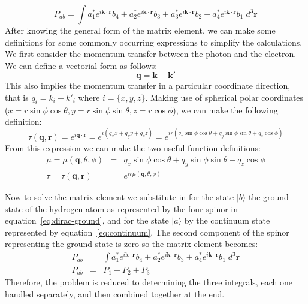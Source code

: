 \documentclass[a4paper,titlepage]{report}
\newcommand{\mb}[1]{\mathbf{#1}}
\newcommand{\ket}[1]{|#1 \rangle}
\begin{document}
	\begin{equation}
		P_{ab} = 
		\int
			a_1^* e^{i \mb{k} \cdot \mb{r}} b_4 + 
			a_2^* e^{i \mb{k} \cdot \mb{r}} b_3 + 
			a_3^* e^{i \mb{k} \cdot \mb{r}} b_2 + 
			a_4^* e^{i \mb{k} \cdot \mb{r}} b_1 
		\; d^3 \mb{r}
	\end{equation}
	After knowing the general form of the matrix element, we can make some
	definitions for some commonly occurring expressions to simplify the
	calculations.
	We first consider the momentum transfer between the photon and the electron.
	We can define a vectorial form as follows:
	\begin{equation}
		\mb{q} = \mb{k} - \mb{k'}
	\end{equation}
	This also implies the momentum transfer in a particular coordinate
	direction, that is $q_i = k_i - k'_i$ where $i = \{x,y,z\}$.
	Making use of spherical polar coordinates ($x = r \sin\phi \cos\theta,
	y = r \sin\phi \sin\theta, z = r \cos\phi$), we can make the following
	definition:
	\begin{equation*}
		\tau(\mb{q},\mb{r}) = e^{i \mb{q} \cdot \mb{r}} 
							= e^{i(q_x x + q_y y + q_z z)} 
							= e^{ir(q_x \sin\phi\cos\theta +
									q_y \sin\phi\sin\theta +
									q_z \cos\phi)}
	\end{equation*}
	From this expression we can make the two useful function definitions:
	\begin{eqnarray}
		\mu = \mu(\mb{q},\theta,\phi) & = & q_x \sin\phi\cos\theta +
								  	  q_y \sin\phi\sin\theta +
								  	  q_z \cos\phi	\\
		\tau = \tau(\mb{q},\mb{r}) & = & e^{ir \mu(\mb{q},\theta,\phi)}
	\end{eqnarray}
	
	Now to solve the matrix element we substitute in for the state $\ket{b}$ the
	ground state of the hydrogen atom as represented by the four spinor in
	equation~\ref{eq:dirac-ground}, and for the state $\ket{a}$ by the continuum
	state represented by equation~\ref{eq:continuum}.
	The second component of the spinor representing the ground state is zero so
	the matrix element becomes:
	\begin{eqnarray*}
		P_{ab} & = & 
		\int
			a_1^* e^{i \mb{k} \cdot \mb{r}} b_4 + 
			a_2^* e^{i \mb{k} \cdot \mb{r}} b_3 + 
			a_4^* e^{i \mb{k} \cdot \mb{r}} b_1 
		\; d^3 \mb{r} \\
		P_{ab} & = & P_1 + P_2 + P_3
	\end{eqnarray*}
	Therefore, the problem is reduced to determining the three integrals, each
	one handled separately, and then combined together at the end.
\end{document}

